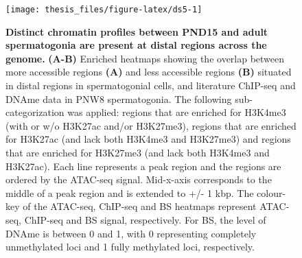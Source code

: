 \documentclass[12pt,twoside]{reedthesis}
\begin{document}
\begin{figure}[H]

{\centering \texttt{[image: thesis\_files/figure-latex/ds5-1]} 

}

\caption[Distinct chromatin profiles between PND15 and adult spermatogonia are present at distal regions across the genome]{\textbf{Distinct chromatin profiles between PND15 and adult spermatogonia are present at distal regions across the genome.} \textbf{(A-B)} Enriched heatmaps showing the overlap between more accessible regions \textbf{(A)} and less accessible regions \textbf{(B)} situated in distal regions in spermatogonial cells, and literature ChIP-seq and DNAme data in PNW8 spermatogonia. The following sub-categorization was applied: regions that are enriched for H3K4me3 (with or w/o H3K27ac and/or H3K27me3), regions that are enriched for H3K27ac (and lack both H3K4me3 and H3K27me3) and regions that are enriched for H3K27me3 (and lack both H3K4me3 and H3K27ac). Each line represents a peak region and the regions are ordered by the ATAC-seq signal. Mid-x-axis corresponds to the middle of a peak region and is extended to +/- 1 kbp. The colour-key of the ATAC-seq, ChIP-seq and BS heatmaps represent ATAC-seq, ChIP-seq and BS signal, respectively. For BS, the level of DNAme is between 0 and 1, with 0 representing completely unmethylated loci and 1 fully methylated loci, respectively.}\label{fig:ds5}
\end{figure}
\end{document}
